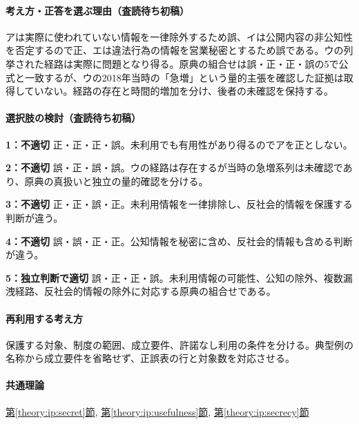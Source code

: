 \paragraph{考え方・正答を選ぶ理由（査読待ち初稿）} アは実際に使われていない情報を一律除外するため誤、イは公開内容の非公知性を否定するので正、エは違法行為の情報を営業秘密とするため誤である。ウの列挙された経路は実際に問題となり得る。原典の組合せは誤・正・正・誤の5で公式と一致するが、ウの2018年当時の「急増」という量的主張を確認した証拠は取得していない。経路の存在と時間的増加を分け、後者の未確認を保持する。

\paragraph{選択肢の検討（査読待ち初稿）}\mbox{}\par

\noindent\textbf{1：不適切} 正・正・正・誤。未利用でも有用性があり得るのでアを正としない。\par

\noindent\textbf{2：不適切} 誤・正・誤・誤。ウの経路は存在するが当時の急増系列は未確認であり、原典の真扱いと独立の量的確認を分ける。\par

\noindent\textbf{3：不適切} 正・正・誤・正。未利用情報を一律排除し、反社会的情報を保護する判断が違う。\par

\noindent\textbf{4：不適切} 誤・誤・正・正。公知情報を秘密に含め、反社会的情報も含める判断が違う。\par

\noindent\textbf{5：独立判断で適切} 誤・正・正・誤。未利用情報の可能性、公知の除外、複数漏洩経路、反社会的情報の除外に対応する原典の組合せである。\par

\paragraph{再利用する考え方} 保護する対象、制度の範囲、成立要件、許諾なし利用の条件を分ける。典型例の名称から成立要件を省略せず、正誤表の行と対象数を対応させる。

\paragraph{共通理論} \hyperref[theory:ip:secret]{第\ref*{theory:ip:secret}節}, \hyperref[theory:ip:usefulness]{第\ref*{theory:ip:usefulness}節}, \hyperref[theory:ip:secrecy]{第\ref*{theory:ip:secrecy}節}

